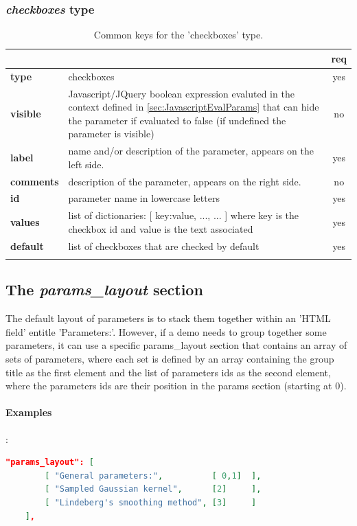 \subsubsection{ \emph{checkboxes} type}

\begin{longtable}{|>{\bf}L{\linewidth}|L{\linewidth}|c|}
\hline
      &  & {\bf req} 
\tabularnewline \hline \hline
 type  & checkboxes   & yes \\ \hline
 visible  & Javascript/JQuery boolean expression evaluted in the context defined 
              in \ref{sec:JavascriptEvalParams} that can hide the parameter if
            evaluated to false (if undefined the parameter is visible)& no \\ \hline
 label  & name and/or description of the parameter, appears on the left side. & yes
                      \\ \hline
 comments & description of the parameter, appears on the right side. & no
                      \\ \hline
 id         & parameter name in lowercase letters  & yes \\ \hline
 values     & list of dictionaries: [ {key:value, ...}, ... ]
            where key is the checkbox id and value is the text associated
            & yes \\ \hline
 default     & list of checkboxes that are checked by default  & yes \\ \hline
\caption{Common keys for the 'checkboxes' type.}
\end{longtable}


\subsection{The \emph{params\_layout} section}

The default layout of parameters is to stack them together within an 'HTML field'
entitle 'Parameters:'. However, if a demo needs to group together some parameters,
it can use a specific params\_layout section that contains an array of
sets of parameters, where each set is defined by an array containing the group 
title as the first element and the list of parameters ids as the second element,
where the parameters ids are their position in the params section (starting at 0).

\paragraph{Examples}:\\
\begin{lstlisting}[language=json,firstnumber=1]
  "params_layout": [
        [ "General parameters:",          [ 0,1]  ],
        [ "Sampled Gaussian kernel",      [2]     ],
        [ "Lindeberg's smoothing method", [3]     ]
    ],
\end{lstlisting}

